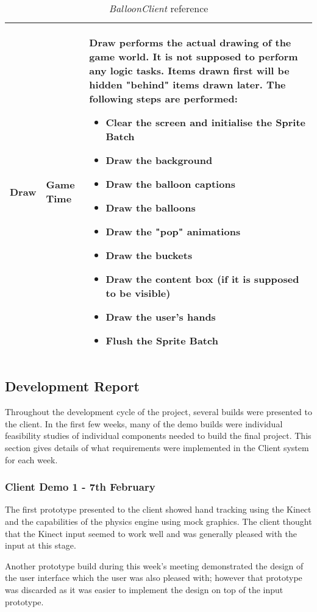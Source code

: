 \begin{table}
\begin{tabular}{|p{3cm}|p{3.6cm}|p{9cm}|}
Draw & Game Time &
Draw performs the actual drawing of the game world. It is not supposed to 
perform any logic tasks. Items drawn first will be hidden "behind" items drawn
later. The following steps are performed:
\begin{itemize}
	\item{Clear the screen and initialise the Sprite Batch}
	\item{Draw the background}
	\item{Draw the balloon captions}
	\item{Draw the balloons}
	\item{Draw the "pop" animations}
	\item{Draw the buckets}
	\item{Draw the content box (if it is supposed to be visible)}
	\item{Draw the user's hands}
	\item{Flush the Sprite Batch}
\end{itemize}
\\ \hline
\end{tabular}
\caption{\emph{BalloonClient} reference}

\label{BalloonClientRef}
\end{table}

\clearpage{}
\subsection{Development Report}
Throughout the development cycle of the project, several builds were presented
to the client. In the first few weeks, many of the demo builds were individual
feasibility studies of individual components needed to build the final project.
This section gives details of what requirements were implemented in the Client
system for each week.

\subsubsection{Client Demo 1 - 7th February}
The first prototype presented to the client showed hand tracking using the
Kinect and the capabilities of the physics engine using mock graphics. The
client thought that the Kinect input seemed to work well and was generally
pleased with the input at this stage.

Another prototype build during this week's meeting demonstrated the design of
the user interface which the user was also pleased with; however that prototype
was discarded as it was easier to implement the design on top of the input
prototype.

